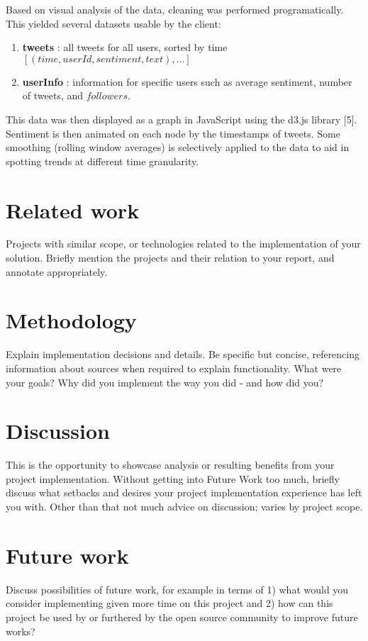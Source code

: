 \documentclass[12pt]{article}
\begin{document}
Based on visual analysis of the data, cleaning was performed programatically. This yielded several datasets usable by the client:
\begin{enumerate}
    \item \textbf{tweets} : all tweets for all users, sorted by time $[(time, userId, sentiment, text), \dots]$
    \item \textbf{userInfo} : information for specific users such as average sentiment, number of tweets, and $followers$.
\end{enumerate}

This data was then displayed as a graph in JavaScript using the d3.js library [5]. Sentiment is then animated on each node by the timestamps of tweets. Some smoothing (rolling window averages) is selectively applied to the data to aid in spotting trends at different time granularity.


\section{Related work}
Projects with similar scope, or technologies related to the implementation of your solution. Briefly mention the projects and their relation to your report, and annotate appropriately.

\section{Methodology}
Explain implementation decisions and details. Be specific but concise, referencing information about sources when required to explain functionality. What were your goals? Why did you implement the way you did - and how did you?\newline



\section{Discussion}
This is the opportunity to showcase analysis or resulting benefits from your project implementation. Without getting into Future Work too much, briefly discuss what setbacks and desires your project implementation experience has left you with. Other than that not much advice on discussion; varies by project scope. 

\section{Future work}
Discuss possibilities of future work, for example in terms of 1) what would you consider implementing given more time on this project and 2) how can this project be used by or furthered by the open source community to improve future works?
\end{document}
